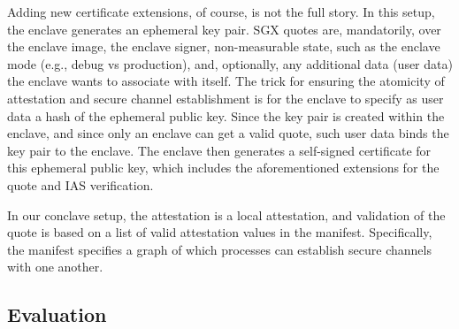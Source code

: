 Adding new certificate extensions, of course, is not the full story.
%
In this setup, the enclave generates an ephemeral key pair.
%
SGX quotes are, mandatorily, over the enclave image, the enclave signer,
non-measurable state, such as the enclave mode (e.g., debug vs production),
and, optionally, any additional data (user data) the enclave wants to
associate with itself.  
%
The trick for ensuring the atomicity of attestation and secure channel
establishment is for the enclave to specify as user data a hash of the ephemeral
public key.
%
Since the key pair is created within the enclave, and since only an enclave can
get a valid quote, such user data binds the key pair to the enclave.
%
The enclave then generates a self-signed certificate for this ephemeral public
key, which includes the aforementioned extensions for the quote and IAS
verification.


In our conclave setup, the attestation is a local attestation, and validation of
the quote is based on a list of valid attestation values in the manifest.
%
Specifically, the manifest specifies a graph of which processes can establish
secure channels with one another.


\subsection{Evaluation}

